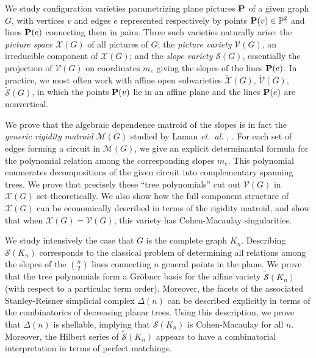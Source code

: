 \documentclass{amsart}
\newcommand{\SR}[1]{\Delta({#1})}
\newcommand{\SA}{\tilde{\mathcal S}}
\newcommand{\VA}{\tilde{\mathcal V}}
\newcommand{\XA}{\tilde{\mathcal X}}
\renewcommand{\S}{{\mathcal S}}
\newcommand{\V}{{\mathcal V}}
\newcommand{\X}{{\mathcal X}}
\newcommand{\PP}{{\mathbb P}}
\newcommand{\Pic}{{\bf P}}
\begin{document}
We study configuration varieties parametrizing plane pictures $\Pic$ of a given graph $G$,
with vertices $v$ and edges $e$ represented respectively by points $\Pic(v) \in \PP^{2}$ and
lines $\Pic(e)$ connecting them in pairs.  Three such varieties naturally arise: the {\it
picture space} $\X(G)$ of all pictures of $G$; the {\it picture variety} $\V(G)$, an
irreducible component of $\X(G)$; and the {\it slope variety} $\S(G)$, essentially the
projection of $\V(G)$ on coordinates $m_{e}$ giving the slopes of the lines $\Pic(e)$.  In
practice, we most often work with affine open subvarieties $\XA(G)$, $\VA(G)$, $\SA(G)$, in
which the points $\Pic(v)$ lie in an affine plane and the lines $\Pic(e)$ are nonvertical.

We prove that the algebraic dependence matroid of the slopes is in fact the {\it generic
rigidity matroid} ${\mathcal M}(G)$ studied by Laman {\it et.\ al.} \cite{Lam70},
\cite{GSS93}.  For each set of edges forming a circuit in ${\mathcal M}(G)$, we give an
explicit determinantal formula for the polynomial relation among the corresponding slopes
$m_e$.  This polynomial enumerates decompositions of the given circuit into complementary
spanning trees. We prove that precisely these ``tree polynomials'' cut out $\V(G)$ in
$\X(G)$ set-theoretically.  We also show how the full component structure of $\X(G)$ can be
economically described in terms of the rigidity matroid, and show that when $\X(G)=\V(G)$,
this variety has Cohen-Macaulay singularities.

We study intensively the case that $G$ is the complete graph $K_n$. Describing
$\S(K_n)$ corresponds to the classical problem of determining all relations among
the slopes of the $\binom{n}{2}$ lines connecting $n$ general points in the plane.
We prove that the tree polynomials form a Gr\"obner basis for the affine variety
$\SA(K_n)$ (with respect to a particular term order). Moreover, the facets of the
associated Stanley-Reisner simplicial complex $\SR{n}$ can be described explicitly
in terms of the combinatorics of decreasing planar trees.  Using this description,
we prove that $\SR{n}$ is shellable, implying that $\S(K_n)$ is Cohen-Macaulay for
all $n$. Moreover, the Hilbert series of $\SA(K_n)$ appears to have a combinatorial
interpretation in terms of perfect matchings.



\end{document}

